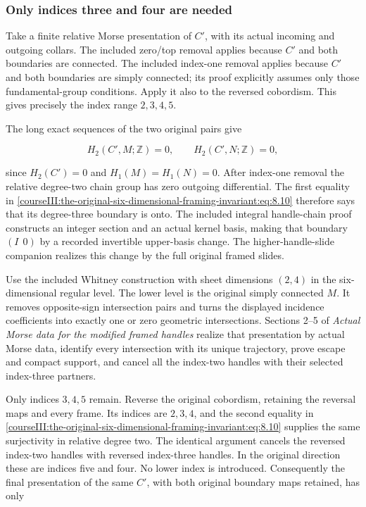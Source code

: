 \subsubsection{Only indices three and four are needed}
\label{courseIII:the-original-six-dimensional-framing-invariant:section-8.3}

Take a finite relative Morse presentation of \(C'\), with its actual incoming and outgoing collars. The included zero/top removal applies because \(C'\) and both boundaries are connected. The included index-one removal applies because \(C'\) and both boundaries are simply connected; its proof explicitly assumes only those fundamental-group conditions. Apply it also to the reversed cobordism. This gives precisely the index range \(2,3,4,5\).

The long exact sequences of the two original pairs give

\begin{equation}
H_2(C',M;\mathbb Z)=0,\qquad
                 H_2(C',N;\mathbb Z)=0,
 \label{courseIII:the-original-six-dimensional-framing-invariant:eq:8.10}
\end{equation}

since \(H_2(C')=0\) and \(H_1(M)=H_1(N)=0\). After index-one removal the relative degree-two chain group has zero outgoing differential. The first equality in \eqref{courseIII:the-original-six-dimensional-framing-invariant:eq:8.10} therefore says that its degree-three boundary is onto. The included integral handle-chain proof constructs an integer section and an actual kernel basis, making that boundary \((I\ \ 0)\) by a recorded invertible upper-basis change. The higher-handle-slide companion realizes this change by the full original framed slides.

Use the included Whitney construction with sheet dimensions \((2,4)\) in the six-dimensional regular level. The lower level is the original simply connected \(M\). It removes opposite-sign intersection pairs and turns the displayed incidence coefficients into exactly one or zero geometric intersections. Sections 2--5 of \emph{Actual Morse data for the modified framed handles} realize that presentation by actual Morse data, identify every intersection with its unique trajectory, prove escape and compact support, and cancel all the index-two handles with their selected index-three partners.

Only indices \(3,4,5\) remain. Reverse the original cobordism, retaining the reversal maps and every frame. Its indices are \(2,3,4\), and the second equality in \eqref{courseIII:the-original-six-dimensional-framing-invariant:eq:8.10} supplies the same surjectivity in relative degree two. The identical argument cancels the reversed index-two handles with reversed index-three handles. In the original direction these are indices five and four. No lower index is introduced. Consequently the final presentation of the same \(C'\), with both original boundary maps retained, has only

